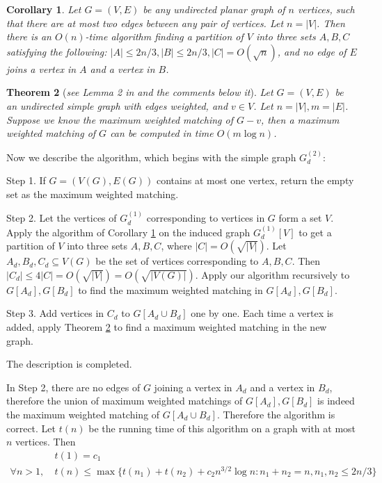 \documentclass[10pt,fleqn]{article}
\newtheorem{theorem}{Theorem}[section]
\newtheorem{corollary}[theorem]{Corollary}
\begin{document}
	\begin{corollary}\label{col61}
		Let $G=(V,E)$ be any undirected planar graph of $n$ vertices, such that there are at most two edges between any pair of vertices. Let $n=|V|$. Then there is an $O(n)$-time algorithm finding a partition of $V$ into three sets $A,B,C$ satisfying the following: $|A|\leq2n/3,|B|\leq2n/3,|C|=O(\sqrt{n})$, and no edge of $E$ joins a vertex in $A$ and a vertex in $B$.
	\end{corollary} \par
	\begin{theorem}[\it{see Lemma 2 in \cite{114} and the comments below it}]\label{thm63}
		Let $G=(V,E)$ be an undirected simple graph with edges weighted, and $v\in V$. Let $n=|V|,m=|E|$. Suppose we know the maximum weighted matching of $G-v$, then a maximum weighted matching of $G$ can be computed in time $O(m\log n)$.
	\end{theorem} \par
	Now we describe the algorithm, which begins with the simple graph $G_{d}^{(2)}$: \par
	Step 1. If $G=(V(G),E(G))$ contains at most one vertex, return the empty set as the maximum weighted matching. \par
	Step 2. Let the vertices of $G_d^{(1)}$ corresponding to vertices in $G$ form a set $V$. Apply the algorithm of Corollary \ref{col61} on the induced graph $G_d^{(1)}[V]$ to get a partition of $V$ into three sets $A,B,C$, where $|C|=O(\sqrt{|V|})$. Let $A_d,B_d,C_d\subseteq V(G)$ be the set of vertices corresponding to $A,B,C$. Then $|C_d|\leq4|C|=O(\sqrt{|V|})=O(\sqrt{|V(G)|})$. Apply our algorithm recursively to $G[A_d],G[B_d]$ to find the maximum weighted matching in $G[A_d],G[B_d]$. \par
	Step 3. Add vertices in $C_d$ to $G[A_d\cup B_d]$ one by one. Each time a vertex is added, apply Theorem \ref{thm63} to find a maximum weighted matching in the new graph. \par
	The description is completed. \par
	In Step 2, there are no edges of $G$ joining a vertex in $A_d$ and a vertex in $B_d$, therefore the union of maximum weighted matchings of $G[A_d],G[B_d]$ is indeed the maximum weighted matching of $G[A_d\cup B_d]$. Therefore the algorithm is correct. Let $t(n)$ be the running time of this algorithm on a graph with at most $n$ vertices. Then
	\begin{equation}
		\begin{aligned}
			& t(1)=c_1 \\
			\forall n>1,\ &t(n)\leq\max\{t(n_1)+t(n_2)+c_2n^{3/2}\log n:n_1+n_2=n,n_1,n_2\leq 2n/3\}
		\end{aligned}
	\end{equation} \par
\end{document}

